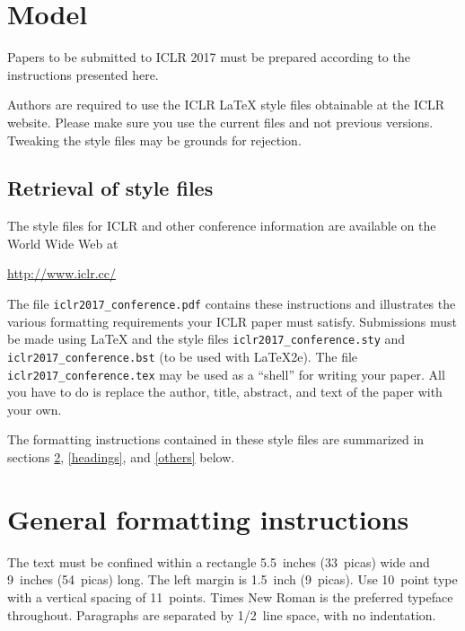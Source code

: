 \documentclass{article} %
\begin{document}
\section{Model}

Papers to be submitted to ICLR 2017 must be prepared according to the
instructions presented here.


Authors are required to use the ICLR \LaTeX{} style files obtainable at the
ICLR website. Please make sure you use the current files and
not previous versions. Tweaking the style files may be grounds for rejection.

\subsection{Retrieval of style files}

The style files for ICLR and other conference information are available on the World Wide Web at
\begin{center}
   \url{http://www.iclr.cc/}
\end{center}
The file \verb+iclr2017_conference.pdf+ contains these
instructions and illustrates the
various formatting requirements your ICLR paper must satisfy.
Submissions must be made using \LaTeX{} and the style files
\verb+iclr2017_conference.sty+ and \verb+iclr2017_conference.bst+ (to be used with \LaTeX{}2e). The file
\verb+iclr2017_conference.tex+ may be used as a ``shell'' for writing your paper. All you
have to do is replace the author, title, abstract, and text of the paper with
your own.

The formatting instructions contained in these style files are summarized in
sections \ref{gen_inst}, \ref{headings}, and \ref{others} below.

\section{General formatting instructions}
\label{gen_inst}

The text must be confined within a rectangle 5.5~inches (33~picas) wide and
9~inches (54~picas) long. The left margin is 1.5~inch (9~picas).
Use 10~point type with a vertical spacing of 11~points. Times New Roman is the
preferred typeface throughout. Paragraphs are separated by 1/2~line space,
with no indentation.
\end{document}
